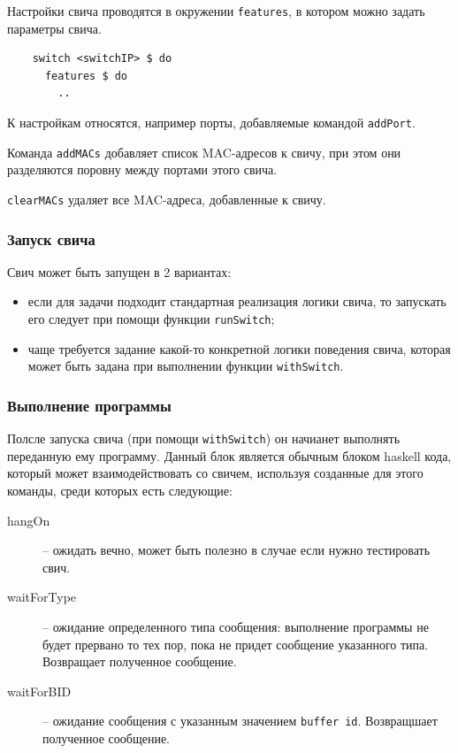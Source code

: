 \documentclass[9pt,a4paper]{article}
\begin{document}
Настройки свича проводятся в окружении \lstinline!features!, в котором можно задать
параметры свича.

\begin{lstlisting}
    switch <switchIP> $ do
      features $ do
        ..
\end{lstlisting}

К настройкам относятся, например порты, добавляемые командой \lstinline!addPort!.

Команда \lstinline!addMACs! добавляет список MAC-адресов к свичу, при этом они разделяются
поровну между портами этого свича.

\lstinline!clearMACs! удаляет все MAC-адреса, добавленные к свичу.


\subsubsection{Запуск свича}

Свич может быть запущен в 2 вариантах:

\begin{itemize}
  \item если для задачи подходит стандартная реализация логики свича, то запускать
    его следует при помощи функции \lstinline!runSwitch!;
  \item чаще требуется задание какой-то конкретной логики поведения свича, которая
    может быть задана при выполнении функции \lstinline!withSwitch!.
\end{itemize}


\subsubsection{Выполнение программы}
Полсле запуска свича (при помощи \lstinline!withSwitch!) он начианет выполнять
переданную ему программу. Данный блок является обычным блоком haskell кода,
который может взаимодействовать со свичем, используя созданные для этого команды,
среди которых есть следующие:

\begin{description}
  \item[hangOn] -- ожидать вечно, может быть полезно в случае если нужно тестировать
свич.

  \item[waitForType] -- ожидание определенного типа сообщения: выполнение программы не будет прервано то тех пор, пока не придет сообщение указанного типа. Возвращает полученное сообщение.

  \item[waitForBID] -- ожидание сообщения с указанным значением \lstinline!buffer id!.
Возвращшает полученное сообщение.

\end{description}
\end{document}
